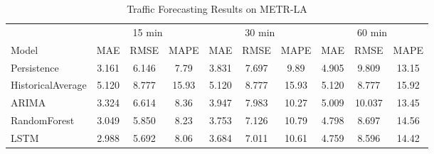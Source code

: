 \begin{table}[ht]
\centering
\caption{Traffic Forecasting Results on METR-LA}
\label{tab:main_results}
\begin{tabular}{l|ccc|ccc|ccc}
\toprule
 & \multicolumn{3}{c|}{15 min} & \multicolumn{3}{c|}{30 min} & \multicolumn{3}{c}{60 min} \\
Model & MAE & RMSE & MAPE & MAE & RMSE & MAPE & MAE & RMSE & MAPE \\
\midrule
Persistence & 3.161 & 6.146 & 7.79 & 3.831 & 7.697 & 9.89 & 4.905 & 9.809 & 13.15 \\
HistoricalAverage & 5.120 & 8.777 & 15.93 & 5.120 & 8.777 & 15.93 & 5.120 & 8.777 & 15.92 \\
ARIMA & 3.324 & 6.614 & 8.36 & 3.947 & 7.983 & 10.27 & 5.009 & 10.037 & 13.45 \\
RandomForest & 3.049 & 5.850 & 8.23 & 3.753 & 7.126 & 10.79 & 4.798 & 8.697 & 14.56 \\
LSTM & 2.988 & 5.692 & 8.06 & 3.684 & 7.011 & 10.61 & 4.759 & 8.596 & 14.42 \\
\bottomrule
\end{tabular}
\end{table}